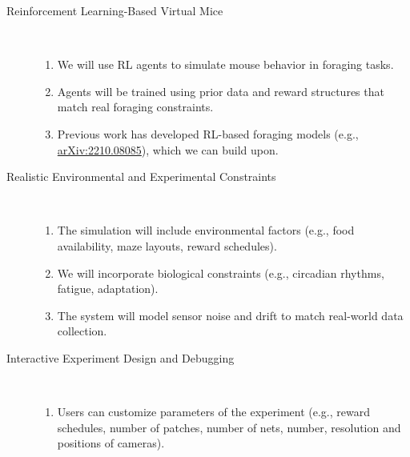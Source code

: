 \documentclass{article}
\begin{document}
\begin{description}
    \item[Reinforcement Learning-Based Virtual Mice]\leavevmode\\

        \begin{enumerate}

            \item We will use RL agents to simulate mouse behavior in foraging tasks.

            \item Agents will be trained using prior data and reward structures that match real foraging constraints.

            \item Previous work has developed RL-based foraging models (e.g.,
                \href{https://arxiv.org/abs/2210.08085}{arXiv:2210.08085}), which we can build upon.  

        \end{enumerate}

    \item[Realistic Environmental and Experimental Constraints]\leavevmode\\

        \begin{enumerate}

            \item The simulation will include environmental factors (e.g., food
                availability, maze layouts, reward schedules).

            \item We will incorporate biological constraints (e.g., circadian
                rhythms, fatigue, adaptation).

            \item The system will model sensor noise and drift to match
                real-world data collection.

        \end{enumerate}

    \item[Interactive Experiment Design and Debugging]\leavevmode\\

        \begin{enumerate}

            \item Users can customize parameters of the experiment (e.g.,
                reward schedules, number of patches, number of nets, number,
                resolution and positions of cameras).


\end{enumerate}
\end{description}
\end{document}

